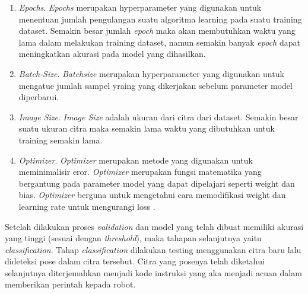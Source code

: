 \begin{enumerate}
  \item \emph{Epochs}. \emph{Epochs} merupakan hyperparameter yang digunakan untuk menentuan jumlah pengulangan suatu algoritma learning pada suatu training dataset. Semakin besar jumlah \emph{epoch} maka akan membutuhkan waktu yang lama dalam melakukan training dataset, namun semakin banyak \emph{epoch} dapat meningkatkan akurasi pada model yang dihasilkan.
  \item \emph{Batch-Size}. \emph{Batchsize} merupakan hyperparameter yang digunakan untuk mengatue jumlah sampel yraing yang dikerjakan sebelum parameter model diperbarui.
  \item \emph{Image Size}. \emph{Image Size} adalah ukuran dari citra dari dataset. Semakin besar suatu ukuran citra maka semakin lama waktu yang dibutuhkan untuk training semakin lama.
  \item \emph{Optimizer}. \emph{Optimizer} merupakan metode yang digunakan untuk meminimalisir eror. \emph{Optimizer} merupakan fungsi matematika yang bergantung pada parameter model yang dapat dipelajari seperti weight dan bias. \emph{Optimizer} berguna untuk mengetahui cara memodifikasi weight dan learning rate untuk mengurangi loss \parencite{optimizer}.
\end{enumerate} 
Setelah dilakukan proses \emph{validation} dan model yang telah dibuat memiliki akurasi yang tinggi (sesuai dengan \emph{threshold}), maka tahapan selanjutnya yaitu \emph{classification}. Tahap \emph{classification} dilakukan testing menggunakan citra baru lalu dideteksi pose dalam citra tersebut. Citra yang posenya telah diketahui selanjutnya diterjemahkan menjadi kode instruksi yang aka menjadi acuan dalam memberikan perintah kepada robot.


